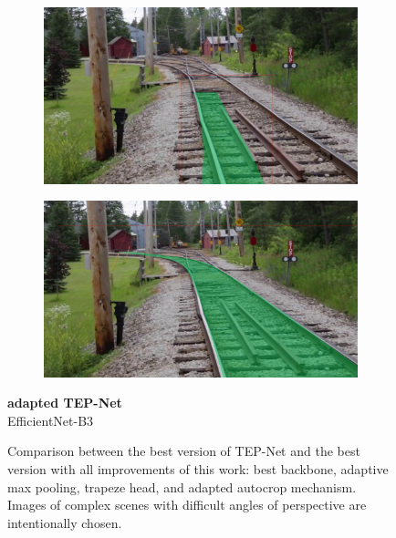 \begin{figure}[H]
\begin{minipage}{0.6\textwidth}
        \begin{subfigure}[b]{0.48\textwidth}
            \centering
            \includegraphics[width=\textwidth]{PICs/experiments/ComparisonBaselineToImproved/original3.jpg}
        \end{subfigure}
        \begin{subfigure}[b]{0.48\textwidth}
            \centering
            \includegraphics[width=\textwidth]{PICs/experiments/ComparisonBaselineToImproved/adapted3.jpg}
        \end{subfigure}
    \end{minipage}%
    \hfill
    \begin{minipage}{0.2\textwidth} %
        \centering
        \textbf{adapted TEP-Net}\\
        EfficientNet-B3
    \end{minipage}
    \caption{Comparison between the best version of TEP-Net \cite{tepNet2024} and the best version with all improvements of this work: best backbone, adaptive max pooling, trapeze head, and adapted autocrop mechanism.
    Images of complex scenes with difficult angles of perspective are intentionally chosen.}
    \label{fig:comparisonBaseline2Improved}
\end{figure}

